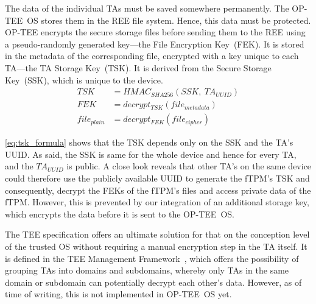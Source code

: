 The data of the individual \acp{TA} must be saved somewhere permanently.
The OP-TEE~OS stores them in the \ac{REE} file system.
Hence, this data must be protected.
OP-TEE encrypts the secure storage files before sending them to the \ac{REE} using a pseudo-randomly generated key---the File Encryption Key~(FEK).
It is stored in the metadata of the corresponding file, encrypted with a key unique to each \ac{TA}---the \ac{TA} Storage Key~(TSK). %
It is derived from the Secure Storage Key~(SSK), which is unique to the device.
\begin{align}
  \label{eq:tsk_formula}
  TSK &= HMAC_{SHA256}(SSK,\ TA_{UUID})\\
  \label{eq:fek_formula}
  FEK &= decrypt_{TSK}(file_{metadata})\\
  file_{plain} &= decrypt_{FEK}(file_{cipher})
\end{align}

\autoref{eq:tsk_formula} shows that the TSK depends only on the SSK and the TA's UUID\@.
As said, the SSK is same for the whole device and hence for every TA, and the \( TA_{UUID} \) is public.
A close look reveals that other TA's on the same device could therefore use the publicly available UUID to generate the fTPM's TSK and consequently, decrypt the FEKs of the fTPM's files and access private data of the fTPM\@.
However, this is prevented by our integration of an additional storage key, which encrypts the data before it is sent to the OP-TEE~OS\@.

The TEE specification offers an ultimate solution for that on the conception level of the trusted OS without requiring a manual encryption step in the TA itself.
It is defined in the TEE Management Framework~\cite{GP_ManagementFramework}, which offers the possibility of grouping TAs into domains and subdomains, whereby only TAs in the same domain or subdomain can potentially decrypt each other's data.
However, as of time of writing, this is not implemented in OP-TEE~OS yet.

